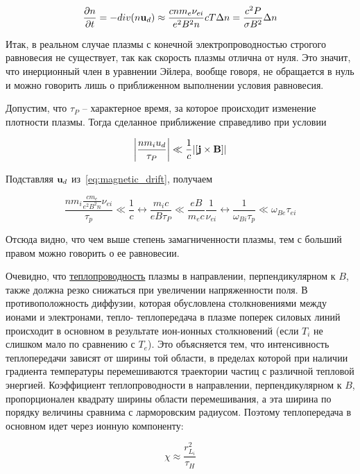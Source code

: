 \documentclass[10pt, a4paper]{article}
\begin{document}
\begin{equation*}
	\pdv{n}{t} = -div(n\vb{u}_d) \approx \frac{cnm_e\nu_{ei}}{e^2 B^2n}cT\Delta n = \frac{c^2P}{\sigma B^2} \Delta n
\end{equation*}

Итак, в реальном случае плазмы с конечной электропроводностью строгого равновесия не существует, так как скорость плазмы отлична от нуля. Это значит, что инерционный член в уравнении Эйлера, вообще говоря, не обращается в нуль и можно говорить лишь о приближенном выполнении условия равновесия.

Допустим, что $\tau_P$ -- характерное время, за которое происходит
изменение плотности плазмы. Тогда сделанное приближение справедливо при условии

\begin{equation*}
	\abs{\frac{nm_iu_d}{\tau_P}} \ll \frac{1}{c} \abs{[\vb{j}\times\vb{B}]}
\end{equation*}

Подставляя $\vb{u}_d$ из~\eqref{eq:magnetic_drift}, получаем

\begin{equation*}
	\frac{nm_i\frac{cm_e}{e^2B^2n}\nu_{ei}}{\tau_p}\ll\frac{1}{c}\leftrightarrow \frac{m_i c}{e B\tau_P} \ll \frac{eB}{m_ec}\frac{1}{\nu_{ei}} \leftrightarrow \frac{1}{\omega_{Bi}\tau_p}\ll\omega_{Be}\tau_{ei}
\end{equation*}

Отсюда видно, что чем выше степень замагниченности плазмы, тем
с больший правом можно говорить о ее равновесии.

Очевидно, что \uline{теплопроводность} плазмы в направлении, перпендикулярном к $B$, также должна резко снижаться при увеличении напряженности поля. В противоположность диффузии, которая обусловлена столкновениями между ионами и электронами, тепло- теплопередача в плазме поперек силовых линий происходит в основном в результате ион-ионных столкновений (если $T_i$ не слишком мало по сравнению с $T_e$). Это объясняется тем, что интенсивность теплопередачи зависят от ширины той области, в пределах которой при наличии градиента температуры перемешиваются траектории частиц с различной тепловой энергией. Коэффициент теплопроводности в направлении, перпендикулярном к $B$, пропорционален квадрату ширины области перемешивания, а эта ширина по порядку величины сравнима с ларморовским радиусом. Поэтому теплопередача в основном идет через ионную компоненту:

\begin{equation*}
	\chi\approx\frac{r^2_{L_i}}{\tau_H}
\end{equation*}
\end{document}
